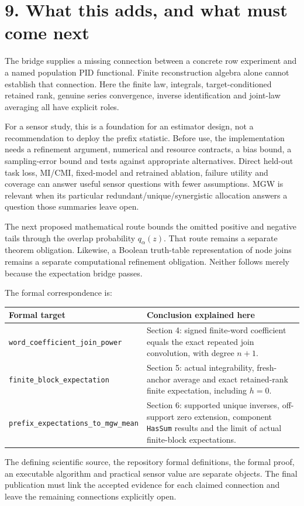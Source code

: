 \section{9. What this adds, and what must come next}\label{what-this-adds-and-what-must-come-next}

The bridge supplies a missing connection between a concrete row experiment and a named population PID functional. Finite reconstruction algebra alone cannot establish that connection. Here the finite law, integrals, target-conditioned retained rank, genuine series convergence, inverse identification and joint-law averaging all have explicit roles.

For a sensor study, this is a foundation for an estimator design, not a recommendation to deploy the prefix statistic. Before use, the implementation needs a refinement argument, numerical and resource contracts, a bias bound, a sampling-error bound and tests against appropriate alternatives. Direct held-out task loss, MI/CMI, fixed-model and retrained ablation, failure utility and coverage can answer useful sensor questions with fewer assumptions. MGW is relevant when its particular redundant/unique/synergistic allocation answers a question those summaries leave open.

The next proposed mathematical route bounds the omitted positive and negative tails through the overlap probability \(q_\alpha(z)\). That route remains a separate theorem obligation. Likewise, a Boolean truth-table representation of node joins remains a separate computational refinement obligation. Neither follows merely because the expectation bridge passes.

The formal correspondence is:

{\def\LTcaptype{none} %
\begin{longtable}[]{@{}
  >{\raggedright\arraybackslash}p{}
  >{\raggedright\arraybackslash}p{}@{}}
\toprule\noalign{}
\begin{minipage}[b]{\linewidth}\raggedright
Formal target
\end{minipage} & \begin{minipage}[b]{\linewidth}\raggedright
Conclusion explained here
\end{minipage} \\
\midrule\noalign{}
\endhead
\bottomrule\noalign{}
\endlastfoot
\texttt{word\_coefficient\_join\_power} & Section 4: signed finite-word coefficient equals the exact repeated join convolution, with degree \(n+1\). \\
\texttt{finite\_block\_expectation} & Section 5: actual integrability, fresh-anchor average and exact retained-rank finite expectation, including \(h=0\). \\
\texttt{prefix\_expectations\_to\_mgw\_mean} & Section 6: supported unique inverses, off-support zero extension, component \texttt{HasSum} results and the limit of actual finite-block expectations. \\
\end{longtable}
}

The defining scientific source, the repository formal definitions, the formal proof, an executable algorithm and practical sensor value are separate objects. The final publication must link the accepted evidence for each claimed connection and leave the remaining connections explicitly open.
